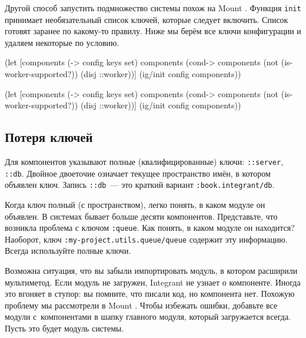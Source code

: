 Другой способ запустить подмножество системы похож на
Mount . Функция \verb|init| принимает необязательный
список ключей, которые следует включить. Список готовят заранее по какому-то
правилу. Ниже мы берём все ключи конфигурации и удаляем некоторые по условию.

\ifx\DEVICETYPE\MOBILE

\begin{english}
  \begin{clojure}
(let [components (-> config keys set)
      components
      (cond-> components
        (not (is-worker-supported?))
        (disj ::worker))]
  (ig/init config components))
  \end{clojure}
\end{english}

\else

\begin{english}
  \begin{clojure}
(let [components (-> config keys set)
      components (cond-> components
                   (not (is-worker-supported?))
                   (disj ::worker))]
  (ig/init config components))
  \end{clojure}
\end{english}

\fi

\subsection{Потеря ключей}


Для компонентов указывают полные (квалифицированные) ключи: \verb|::server|,
\verb|::db|. Двойное двоеточие означает текущее пространство имён, в котором
объявлен ключ. Запись \verb|::db|~--- это краткий вариант
\verb|:book.integrant/db|.

Когда ключ полный (с пространством), легко понять, в каком модуле он объявлен. В
системах бывает больше десяти компонентов. Представьте, что возникла проблема с
ключом \verb|:queue|. Как понять, в каком модуле он находится?  Наоборот, ключ
\texttt{:my-project.utils.queue\-/queue} содержит эту информацию. Всегда используйте
полные ключи.

Возможна ситуация, что вы забыли импортировать модуль, в котором расширили
мультиметод. Если модуль не загружен, Integrant не узнает о компоненте. Иногда
это вгоняет в ступор: вы помните, что писали код, но компонента нет. Похожую
проблему мы рассмотрели в Mount . Чтобы избежать ошибки,
добавьте все модули с~компонентами в шапку главного модуля, который загружается
всегда. Пусть это будет модуль системы.


